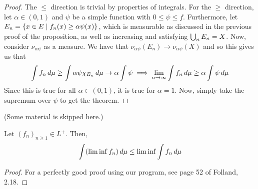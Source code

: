 \documentclass[11pt,leqno,oneside]{amsbook}
\numberwithin{thm}{section}
\begin{document}
\begin{proof}
  The \(\leq\) direction is trivial by properties of integrals. For
  the \(\geq\) direction, let \(\alpha \in (0,1)\) and \(\psi\) be
  a simple function with \(0 \leq \psi \leq f\). Furthermore, let
  \(E_n = \{x \in E \mid f_n(x) \geq \alpha \psi(x)\}\), which is
  measurable as discussed in the previous proof of the proposition, as
  well as increasing and satisfying \(\bigcup_n E_n = X\). Now,
  consider \(\nu_{\alpha \psi}\) as a measure. We have that
  \(\nu_{\alpha \psi}(E_n) \to \nu_{\alpha \psi}(X)\) and so this
  gives us that \[
    \int f_n \, d\mu \geq \int \alpha \psi \chi_{E_n} \, d\mu \to \alpha
    \int \psi \implies \lim_{n \to \infty} \int f_n \, d\mu \geq \alpha
    \int \psi \, d\mu
  \]
  Since this is true for all \(\alpha \in (0,1)\), it is true for
  \(\alpha = 1\). Now, simply take the supremum over \(\psi\) to get
  the theorem.
\end{proof}

(Some material is skipped here.)

\begin{lem}
  Let \((f_n)_{n \geq 1} \in L^+\). Then, \[
    \int (\lim \inf f_n) \, d\mu \leq \lim \inf \int f_n \, d\mu
  \]
\end{lem}
\begin{proof}
  For a perfectly good proof using our program, see page 52 of
  Folland, 2.18.
\end{proof}
\end{document}
